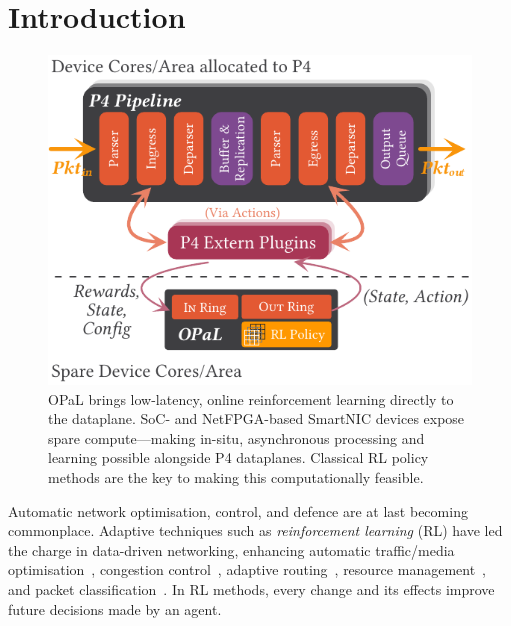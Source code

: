 \documentclass[
sigconf,natbib=false
,anonymous=true
,10pt
]{acmart}
\newcommand{\approachshort}{OPaL}
\begin{document}
\section{Introduction}
\begin{figure}
	\centering
	\includegraphics[keepaspectratio, width=0.65\linewidth]{figures/arch-with-p4}
	\caption{\approachshort{} brings low-latency, online reinforcement learning directly to the dataplane. SoC- and NetFPGA-based SmartNIC devices expose spare compute---making in-situ, asynchronous processing and learning possible alongside P4 dataplanes. Classical RL policy methods are the key to making this computationally feasible.\label{fig:netro-arch}}
\end{figure}
Automatic network optimisation, control, and defence are at last becoming commonplace.
Adaptive techniques such as \emph{reinforcement learning} (RL) have led the charge in data-driven networking, enhancing automatic traffic/media optimisation~\parencite{DBLP:conf/sigcomm/ChenL0L18,DBLP:conf/sigcomm/MaoNA17}, congestion control~\parencite{DBLP:journals/corr/abs-1910-04054}, adaptive routing~\parencite{DBLP:conf/hotnets/ValadarskySST17,DBLP:conf/conext/GiladSGRS20}, resource management~\parencite{DBLP:conf/hotnets/MaoAMK16}, and packet classification~\parencite{DBLP:conf/sigcomm/LiangZJS19}.
In RL methods, every change and its effects improve future decisions made by an agent.
\end{document}
